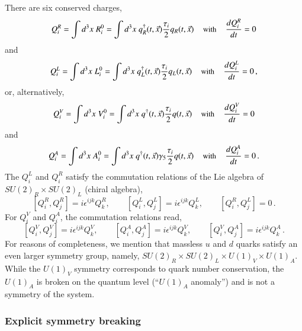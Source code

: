 \documentclass[sort&compress,preprint,3p]{elsarticle}
\begin{document}
There are six conserved charges,
\begin{equation}
Q^R_i = \int d^3x \; R^0_i = \int d^3x \; q_R^\dagger (t,\vec x) 
\frac{\tau_i}{2} q_R(t,\vec x)
\;\;\;\; \mbox{\small\rm with} \;\;\;\; \frac{dQ^R_i}{dt} = 0
\end{equation}
and
\begin{equation}
Q^L_i = \int d^3x \; L^0_i = \int d^3x \; q_L^\dagger (t,\vec x) 
\frac{\tau_i}{2} q_L(t,\vec x)
\;\;\;\; \mbox{\small\rm with} \;\;\;\; \frac{dQ^L_i}{dt} = 0
\, ,
\end{equation}
or, alternatively,
\begin{equation}
Q^V_i = \int d^3x \; V^0_i = \int d^3x \; q^\dagger (t,\vec x) 
\frac{\tau_i}{2} q(t,\vec x)
\;\;\;\; \mbox{\small\rm with} \;\;\;\; \frac{dQ^V_i}{dt} = 0
\end{equation}
and
\begin{equation}
Q^A_i = \int d^3x \; A^0_i = \int d^3x \; q^\dagger (t,\vec x) 
\gamma_5 \frac{\tau_i}{2} q(t,\vec x)
\;\;\;\; \mbox{\small\rm with} \;\;\;\; \frac{dQ^A_i}{dt} = 0
\, .
\label{eq_charges}
\end{equation}
The $Q^L_i$ and $Q^R_i$ satisfy the commutation relations 
of the Lie algebra of $SU(2)_R\times SU(2)_L$ (chiral algebra),
\begin{equation}
\left[ Q^R_i, Q^R_j \right] = i \epsilon^{ijk} Q^R_k, \quad \quad
\left[ Q^L_i, Q^L_j \right] = i \epsilon^{ijk} Q^L_k, \quad \quad
\left[ Q^R_i, Q^L_j \right] = 0
\,.
\end{equation}
For $Q^V_i$ and $Q^A_i$, the commutation relations read,
\begin{equation}
\left[ Q^V_i, Q^V_j \right] = i \epsilon^{ijk} Q^V_k, \quad \quad
\left[ Q^A_i, Q^A_j \right] = i \epsilon^{ijk} Q^V_k, \quad \quad
\left[ Q^V_i, Q^A_j \right] = i \epsilon^{ijk} Q^A_k
\,.
\end{equation}
For reasons of completeness, we mention that massless $u$ and $d$ quarks satisfy
an even larger symmetry group, namely,  $SU(2)_R\times SU(2)_L\times U(1)_V\times U(1)_A$. 
While the $U(1)_V$ symmetry corresponds to quark number conservation, the
$U(1)_A$ is broken on the quantum level (``$U(1)_A$ anomaly'') and is not a symmetry
of the system.


\subsubsection{Explicit symmetry breaking}
\end{document}

